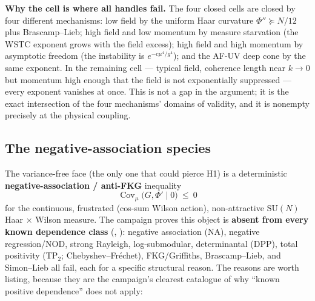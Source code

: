 \textbf{Why the cell is where all handles fail.} The four closed cells are closed by four
different mechanisms: low field by the uniform Haar curvature $\Phi''\succeq N/12$ plus
Brascamp--Lieb; high field and low momentum by measure starvation (the WSTC exponent grows with
the field excess); high field and high momentum by asymptotic freedom (the instability is
$e^{-c\mu^4/g^4}$); and the AF-UV deep cone by the same exponent. In the remaining cell ---
typical field, coherence length near $k\to0$ but momentum high enough that the field is not
exponentially suppressed --- every exponent vanishes at once. This is not a gap in the
argument; it is the exact intersection of the four mechanisms' domains of validity, and it is
nonempty precisely at the physical coupling.

\subsection{The negative-association species}
\label{sec:negspecies}

The variance-free face (the only one that could pierce H1) is a deterministic
\textbf{negative-association / anti-FKG} inequality
\begin{equation}
\operatorname{Cov}_\mu\bigl(G,\Phi'\mid0\bigr)\ \le\ 0
\label{eq:neqassoc}
\end{equation}
for the continuous, frustrated (cos-sum Wilson action), non-attractive $\mathrm{SU}(N)$
Haar $\times$ Wilson measure. The campaign proves this object is \textbf{absent from every known
dependence class} (, ): negative association
(NA), negative regression/NOD, strong Rayleigh, log-submodular, determinantal (DPP), total
positivity (TP$_2$; Chebyshev--Fr\'echet), FKG/Griffiths, Brascamp--Lieb, and Simon--Lieb all
fail, each for a specific structural reason. The reasons are worth listing, because they are the
campaign's clearest catalogue of why ``known positive dependence'' does not apply:

